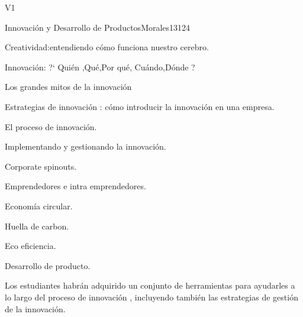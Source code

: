 \begin{syllabus}
\begin{competences}{V1}
    \item {}
    \item {}
    \item {}
    \item {}
\end{competences}

\begin{unit}{Innovación y Desarrollo de Productos}{}{Morales13}{12}{4}
   \begin{topics}
      \item Creatividad:entendiendo cómo funciona nuestro cerebro.
      \item Innovación: ?` Quién ,Qué,Por qué, Cuándo,Dónde ?
      \item Los grandes mitos de la innovación
      \item Estrategias de innovación : cómo introducir la innovación en una empresa.
      \item El proceso de innovación.
      \item Implementando y gestionando la innovación.
      \item Corporate spinouts.
      \item Emprendedores e intra emprendedores.
      \item Economía circular.
      \item Huella de carbon.
      \item Eco eficiencia.
      \item Desarrollo de producto.
   \end{topics}
   \begin{learningoutcomes}
      \item Los estudiantes habrán adquirido un conjunto de herramientas para ayudarles a lo largo del proceso de innovación , incluyendo también las estrategias de gestión de la innovación.
   \end{learningoutcomes}
\end{unit}

\begin{coursebibliography}
\end{coursebibliography}

\end{syllabus}
